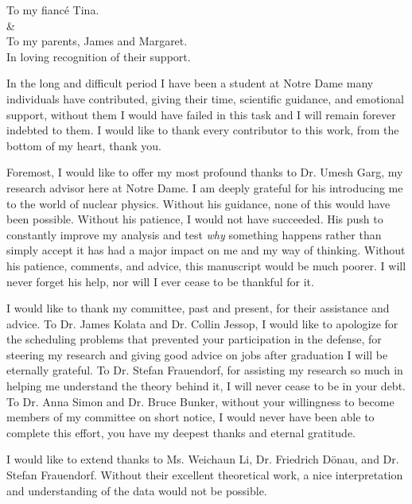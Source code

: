 \documentclass[final,numrefs,sort&compress]{nddiss2e}
\begin{document}
\begin{dedication}
	To my fianc\'e Tina.\\\&\\To my parents, James and Margaret.\\
	In loving recognition of their support.
\end{dedication}

\tableofcontents
\listoffigures
\listoftables

\begin{acknowledge}
In the long and difficult period I have been a student at Notre Dame many individuals have contributed, giving their time, scientific guidance, and emotional support, without them I would have failed in this task and I will remain forever indebted to them. I would like to thank every contributor to this work, from the bottom of my heart, thank you.

Foremost, I would like to offer my most profound thanks to Dr. Umesh Garg, my research advisor here at Notre Dame. I am deeply grateful for his introducing me to the world of nuclear physics. Without his guidance, none of this would have been possible. Without his patience, I would not have succeeded. His push to constantly improve my analysis and test \emph{why} something happens rather than simply accept it has had a major impact on me and my way of thinking. Without his patience, comments, and advice, this manuscript would be much poorer. I will never forget his help, nor will I ever cease to be thankful for it.

I would like to thank my committee, past and present, for their assistance and advice. To Dr. James Kolata and Dr. Collin Jessop, I would like to apologize for the scheduling problems that prevented your participation in the defense, for steering my research and giving good advice on jobs after graduation I will be eternally grateful. To Dr. Stefan Frauendorf, for assisting my research so much in helping me understand the theory behind it, I will never cease to be in your debt. To Dr. Anna Simon and Dr. Bruce Bunker, without your willingness to become members of my committee on short notice, I would never have been able to complete this effort, you have my deepest thanks and eternal gratitude.

I would like to extend thanks to Ms. Weichaun Li, Dr. Friedrich D\"onau, and Dr. Stefan Frauendorf. Without their excellent theoretical work, a nice interpretation and understanding of the data would not be possible.


\end{acknowledge}
\end{document}
